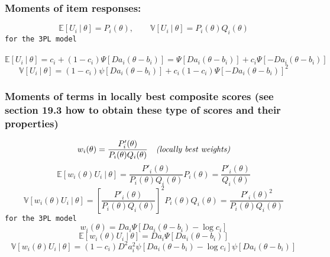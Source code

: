 \subsubsection{Moments of item responses:} %
\begin{equation}
\mathbb{E}[U_i \ | \ \theta]=P_i(\theta), \qquad \mathbb{V}[U_i \ | \ \theta]=P_i(\theta)Q_i(\theta)
\end{equation}
\texttt{for the 3PL model} \\\
\begin{equation}
\mathbb{E}[U_i \ | \ \theta]=c_i+(1-c_i)\Psi[D a_i(\theta - b_i)]=\Psi[D a_i(\theta - b_i)]+c_i\Psi[-D a_i(\theta - b_i)]
\end{equation}
\begin{equation}
\mathbb{V}[U_i \ | \ \theta]=(1-c_i)\psi[D a_i(\theta - b_i)]+ c_i(1-c_i)\Psi[-D a_i(\theta - b_i)]^2
\end{equation}
\subsubsection{Moments of terms in locally best composite scores (see section 19.3 \cite{lord1968} how to obtain these type of scores and their properties)}%
\begin{equation}
w_i(\theta)=\frac{P'_i(\theta)}{P_i(\theta)Q_i(\theta)} \quad \text{\textit{(locally best weights)}}
\end{equation}
\begin{equation}
\mathbb{E}[w_i(\theta)U_i \ | \ \theta]=\frac{P'_i(\theta)}{P_i(\theta)Q_i(\theta)}P_i(\theta)=\frac{P'_i(\theta)}{Q_i(\theta)}
\end{equation}
\begin{equation}
\mathbb{V}[w_i(\theta)U_i \ | \ \theta]=\left[\frac{P'_i(\theta)}{P_i(\theta)Q_i(\theta)}\right]^2 P_i(\theta)Q_i(\theta)=\frac{P'_i(\theta)^2}{P_i(\theta)Q_i(\theta)}
\end{equation}
\texttt{for the 3PL model}
\begin{equation}
w_i(\theta)=Da_i\Psi[D a_i(\theta - b_i)-\log c_i]
\end{equation}
\begin{equation}\label{eq:compexp}
\mathbb{E}[w_i(\theta)U_i \ | \ \theta]=Da_i\Psi[D a_i(\theta - b_i)]
\end{equation}
\begin{equation}\label{eq:compvar}
\mathbb{V}[w_i(\theta)U_i \ | \ \theta]=(1-c_i)D^2a_i ^2\psi[D a_i(\theta - b_i)- \log c_i]\psi[D a_i(\theta - b_i)]
\end{equation}
